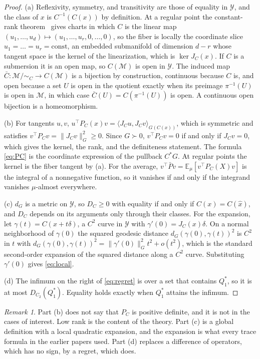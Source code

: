 \documentclass[11pt]{article}
\theoremstyle{definition}
\theoremstyle{remark}
\newtheorem*{remark}{Remark}
\newcommand{\PC}{P_{C}}
\newcommand{\M}{\mathcal{M}}
\newcommand{\Y}{\mathcal{Y}}
\newcommand{\E}{\mathbb{E}}
\newcommand{\dG}{d_{G}}
\begin{document}
\begin{proof}
(a) Reflexivity, symmetry, and transitivity are those of equality in $\Y$, and the class of $x$ is $C^{-1}(C(x))$ by definition.
At a regular point the constant-rank theorem~\cite{lee2012} gives charts in which $C$ is the linear map $(u_{1},\dots,u_{d})\mapsto(u_{1},\dots,u_{r},0,\dots,0)$, so the fiber is locally the coordinate slice $u_{1}=\dots=u_{r}=\text{const}$, an embedded submanifold of dimension $d-r$ whose tangent space is the kernel of the linearization, which is $\ker J_{C}(x)$.
If $C$ is a submersion it is an open map, so $C(\M)$ is open in $\Y$.
The induced map $\bar{C}:\M/\!\sim_{C}\to C(\M)$ is a bijection by construction, continuous because $C$ is, and open because a set $U$ is open in the quotient exactly when its preimage $\pi^{-1}(U)$ is open in $\M$, in which case $\bar{C}(U)=C(\pi^{-1}(U))$ is open.
A continuous open bijection is a homeomorphism.

(b) For tangents $u,v$, $u^{\top}\PC(x)v=\langle J_{C}u,J_{C}v\rangle_{G(C(x))}$, which is symmetric and satisfies $v^{\top}\PC v=\|J_{C}v\|_{G}^{2}\ge0$.
Since $G\succ0$, $v^{\top}\PC v=0$ if and only if $J_{C}v=0$, which gives the kernel, the rank, and the definiteness statement.
The formula \eqref{eq:PC} is the coordinate expression of the pullback $C^{*}G$.
At regular points the kernel is the fiber tangent by (a).
For the average, $v^{\top}\bar{P}v=\E_{\mu}[v^{\top}\PC(X)v]$ is the integral of a nonnegative function, so it vanishes if and only if the integrand vanishes $\mu$-almost everywhere.

(c) $\dG$ is a metric on $\Y$, so $D_{C}\ge0$ with equality if and only if $C(x)=C(\hat{x})$, and $D_{C}$ depends on its arguments only through their classes.
For the expansion, let $\gamma(t)=C(x+t\delta)$, a $C^{2}$ curve in $\Y$ with $\gamma'(0)=J_{C}(x)\delta$.
On a normal neighborhood of $\gamma(0)$ the squared geodesic distance $\dG(\gamma(0),\gamma(t))^{2}$ is $C^{2}$ in $t$ with $\dG(\gamma(0),\gamma(t))^{2}=\|\gamma'(0)\|_{G}^{2}t^{2}+o(t^{2})$, which is the standard second-order expansion of the squared distance along a $C^{2}$ curve.
Substituting $\gamma'(0)$ gives \eqref{eq:local}.

(d) The infimum on the right of \eqref{eq:regret} is over a set that contains $Q_{1}^{*}$, so it is at most $D_{C_{2}}(Q_{1}^{*})$.
Equality holds exactly when $Q_{1}^{*}$ attains the infimum.
\end{proof}

\begin{remark}
Part (b) does not say that $\PC$ is positive definite, and it is not in the cases of interest.
Low rank is the content of the theory.
Part (c) is a global definition with a local quadratic expansion, and the expansion is what every trace formula in the earlier papers used.
Part (d) replaces a difference of operators, which has no sign, by a regret, which does.
\end{remark}
\end{document}
